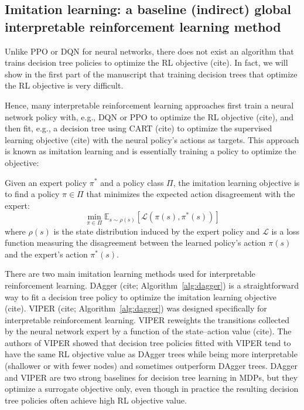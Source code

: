 \subsection{Imitation learning: a baseline (indirect) global interpretable reinforcement learning method}

Unlike PPO or DQN for neural networks, there does not exist an algorithm that trains decision tree policies to optimize the RL objective (cite).
In fact, we will show in the first part of the manuscript that training decision trees that optimize the RL objective is very difficult.

Hence, many interpretable reinforcement learning approaches first train a neural network policy with, e.g., DQN or PPO to optimize the RL objective (cite), and then fit, e.g., a decision tree using CART (cite) to optimize the supervised learning objective (cite) with the neural policy's actions as targets.
This approach is known as imitation learning and is essentially training a policy to optimize the objective:

\begin{definition}
Given an expert policy $\pi^*$ and a policy class $\Pi$, the imitation learning objective is to find a policy $\pi \in \Pi$ that minimizes the expected action disagreement with the expert:
\begin{equation}
\min_{\pi \in \Pi} \mathbb{E}_{s \sim \rho(s)} \left[ \mathcal{L}(\pi(s), \pi^*(s)) \right]
\end{equation}
where $\rho(s)$ is the state distribution induced by the expert policy and $\mathcal{L}$ is a loss function measuring the disagreement between the learned policy's action $\pi(s)$ and the expert's action $\pi^*(s)$.
\end{definition}

There are two main imitation learning methods used for interpretable reinforcement learning.
DAgger (cite; Algorithm~\ref{alg:dagger}) is a straightforward way to fit a decision tree policy to optimize the imitation learning objective (cite).
VIPER (cite; Algorithm~\ref{alg:dagger}) was designed specifically for interpretable reinforcement learning.
VIPER reweights the transitions collected by the neural network expert by a function of the state–action value (cite).
The authors of VIPER showed that decision tree policies fitted with VIPER tend to have the same RL objective value as DAgger trees while being more interpretable (shallower or with fewer nodes) and sometimes outperform DAgger trees.
DAgger and VIPER are two strong baselines for decision tree learning in MDPs, but they optimize a surrogate objective only, even though in practice the resulting decision tree policies often achieve high RL objective value.

